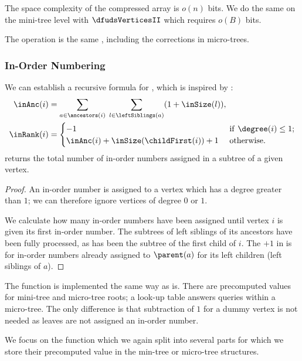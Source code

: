 The space complexity of the compressed array is $o(n)$ bits.
We do the same on the mini-tree level with $\dfudsVerticesII$ which requires $o(B)$ bits.

The operation \dfudsSelect{} is the same \preSelect{}, including the corrections in micro-trees.

\subsubsection{In-Order Numbering}

\begin{lemma}
	We can establish a recursive formula for \inRank{}, which is inspired by \dfudsRank{}:
	\begin{align*}
		\inAnc(i) &= \sum_{a \in \ancestors(i)} \; \sum_{l \in \leftSiblings(a)} (1 + \inSize(l)), \\
		\inRank(i) &= \begin{cases}
			-1 & \textif \degree(i) \le 1; \\
			\inAnc(i) + \inSize(\childFirst(i)) + 1 & \textotherwise.
		\end{cases}
	\end{align*}
	\inSize{} returns the total number of in-order numbers assigned in a subtree of a given vertex.
\end{lemma}
\begin{proof}
	An in-order number is assigned to a vertex which has a degree greater than $1$; we can therefore ignore vertices of degree $0$ or $1$.
	
	We calculate how many in-order numbers have been assigned until vertex $i$ is given its first in-order number.
	The subtrees of left siblings of its ancestors have been fully processed, as has been the subtree of the first child of $i$.
	The $+1$ in \inAnc{} is for in-order numbers already assigned to $\parent(a)$ for its left children (left siblings of $a$).
\end{proof}

The function \inSize{} is implemented the same way as \subtreeSize{} is.
There are precomputed values for mini-tree and micro-tree roots; a look-up table answers queries within a micro-tree.
The only difference is that subtraction of $1$ for a dummy vertex is not needed as leaves are not assigned an in-order number.

We focus on the function \inAnc{} which we again split into several parts for which we store their precomputed value in the min-tree or micro-tree structures.

